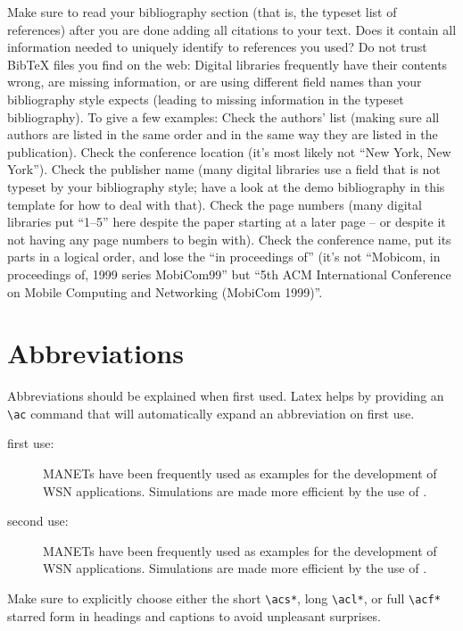 \documentclass[]{ccs-thesis}
\begin{document}
{Make sure to read your bibliography section (that is, the typeset list of references) after you are done adding all citations to your text.
Does it contain all information needed to uniquely identify to references you used?
Do not trust BibTeX files you find on the web:
Digital libraries frequently have their contents wrong, are missing information, or are using different field names than your bibliography style expects (leading to missing information in the typeset bibliography).
To give a few examples:
Check the authors' list (making sure all authors are listed in the same order and in the same way they are listed in the publication).
Check the conference location (it's most likely not ``New York, New York'').
Check the publisher name (many digital libraries use a field that is not typeset by your bibliography style; have a look at the demo bibliography in this template for how to deal with that).
Check the page numbers (many digital libraries put ``1--5'' here despite the paper starting at a later page -- or despite it not having any page numbers to begin with).
Check the conference name, put its parts in a logical order, and lose the ``in proceedings of'' (it's not ``Mobicom, in proceedings of, 1999 series MobiCom99'' but ``5th ACM International Conference on Mobile Computing and Networking (MobiCom 1999)''.


\section{Abbreviations}

Abbreviations should be explained when first used.
Latex helps by providing an \verb|\ac| command that will automatically expand an abbreviation on first use.

\begin{description}

\item[first use:]
\acp{MANET} have been frequently used as examples for the development of \ac{WSN} applications.
Simulations are made more efficient by the use of .

\item[second use:]
\acp{MANET} have been frequently used as examples for the development of \ac{WSN} applications.
Simulations are made more efficient by the use of .

\end{description}

Make sure to explicitly choose either the short \verb|\acs*|, long \verb|\acl*|, or full \verb|\acf*| starred form in headings and captions to avoid unpleasant surprises.

}
\end{document}
